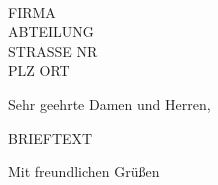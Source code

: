 \documentclass[%
  fontsize=11pt, %
  version=last%
]{scrlttr2}
\begin{document}
\begin{letter}{ 
	\indent\\ %
	FIRMA\\
	ABTEILUNG\\
	STRASSE NR\\
	PLZ ORT
}

\opening{Sehr geehrte Damen und Herren,}

BRIEFTEXT

\closing{Mit freundlichen Grüßen}

\bfseries
{} %


\end{letter}
\end{document}
